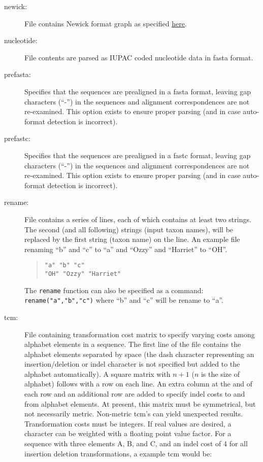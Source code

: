 \begin{description}
		\item [newick:] File contains Newick format graph as specified 
		\href{https://evolution.genetics.washington.edu/phylip/newick_doc.html}{here}.
			
		\item [nucleotide:] File contents are parsed as IUPAC coded nucleotide data in fasta 
			\citep{PearsonandLipman1988} format.
			
		\item [prefasta:] Specifies that the sequences are prealigned in a fasta format, leaving gap characters
			(``-'') in the sequences and alignment correspondences are not re-examined. This option exists to 
			ensure proper parsing (and in case auto-format detection is incorrect).
			
		\item [prefastc:] Specifies that the sequences are prealigned in a fastc format, leaving gap characters
			(``-'') in the sequences and alignment correspondences are not re-examined. This option exists 
			to ensure proper parsing (and in case auto-format detection is incorrect).
			
		\item [rename:] File contains a series of lines, each of which contains at least two strings. The second 
		(and all following) strings (input taxon names),
			will be replaced by the first string (taxon name) on the line. An example file renaming ``b'' and ``c'' 
			to ``a'' and ``Ozzy'' and ``Harriet'' to ``OH''.
				\begin{quote}
					\texttt{"a" "b" "c"}\\
					\texttt{"OH" "Ozzy" "Harriet"}
				\end{quote}
		
		The \texttt{rename} function can also be specified as a command: \texttt{rename("a","b","c")} where 
		``b'' and ``c'' will be rename to ``a''. 
			 
		\item [tcm:] File containing transformation cost matrix to specify varying costs among alphabet elements 
		in a sequence. The first line of the file contains the alphabet elements separated by space (the dash 
		character representing an insertion/deletion or indel character is not specified but added to the alphabet 
		automatically). A square matrix with $n + 1$ ($n$ is the size of alphabet) follows with a row on each line. 
		An extra column at the and of each row and an additional row are added to specify indel costs to and from 
		alphabet elements. At present, this matrix must be symmetrical, but not necessarily metric. Non-metric 
		tcm's can yield unexpected results. Transformation costs must be integers. If real values are desired, a 
		character can be weighted with a floating point value factor. For a sequence with three elements A, B, and 
		C, and an indel cost of 4 for all insertion deletion transformations, a example tcm would be:
		

\end{description}
